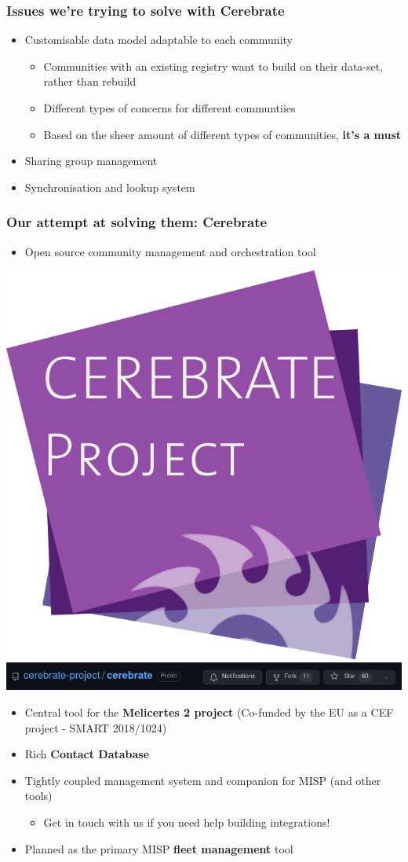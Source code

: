 \begin{frame}
\frametitle{Issues we're trying to solve with Cerebrate}
    \begin{itemize}
        \item Customisable data model adaptable to each community
        \begin{itemize}
            \item Communities with an existing registry want to build on their data-set, rather than rebuild
            \item Different types of concerns for different communtiies
            \item Based on the sheer amount of different types of communities, \textbf{it's a must}
        \end{itemize}
        \item Sharing group management
        \item Synchronisation and lookup system
    \end{itemize}
\end{frame}

\begin{frame}
\frametitle{Our attempt at solving them: Cerebrate}
    \begin{itemize}
        \item Open source community management and orchestration tool
    \end{itemize}
    \begin{center}
        \includegraphics[width=0.15\linewidth]{pictures/logo.png}
        \linebreak
        \includegraphics[width=0.99\linewidth]{pictures/cerebrate-github.png}
    \end{center}
    \begin{itemize}
        \item Central tool for the \textbf{Melicertes 2 project} (Co-funded by the EU as a CEF project - SMART 2018/1024)
        \item Rich \textbf{Contact Database}
        \item Tightly coupled management system and companion for MISP (and other tools)
        \begin{itemize}
            \item Get in touch with us if you need help building integrations!
        \end{itemize}
        \item Planned as the primary MISP \textbf{fleet management} tool
    \end{itemize}
\end{frame}

